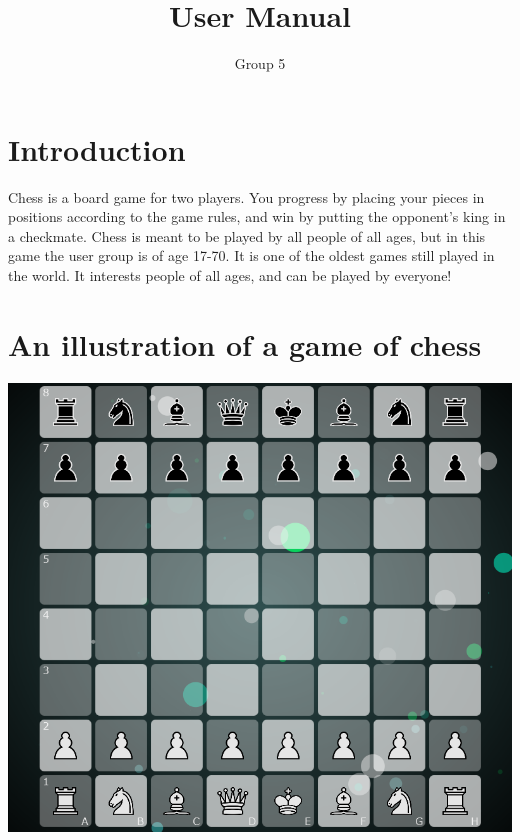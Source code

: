\documentclass{article}
\title{User Manual}
\author{Group 5}
\date{}
\begin{document}
    \maketitle
    \section{Introduction}
    \noindent
    Chess is a board game for two players. You progress by placing your pieces in positions according to the game rules, and win by putting the opponent's king in a checkmate. Chess is meant to be played by all people of all ages, but in this game the user group is of age 17-70. It is one of the oldest games still played in the world. It interests people of all ages, and can be played by everyone!
    
    \section{An illustration of a game of chess}
	\begin{center}
    	\includegraphics[scale=0.6]{image5.png} 
    \end{center}
    
\end{document}
